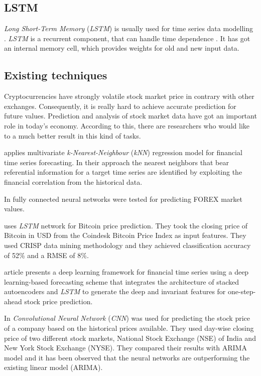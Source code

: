 \documentclass[conference]{IEEEtran}
\begin{document}
\subsection{LSTM}

\emph{Long Short-Term Memory} (\emph{LSTM}) is usually used for time series data modelling \cite{lstm}. \emph{LSTM} is a recurrent component, that can handle time dependence \cite{rnn}. It has got an internal memory cell, which provides weights for old and new input data.

\subsection{Existing techniques}

Cryptocurrencies have strongly volatile stock market price in contrary with other exchanges. Consequently, it is really hard to achieve accurate prediction for future values. Prediction and analysis of stock market data have got an important role in today’s economy. According to this, there are researchers who would like to a much better result in this kind of tasks.

\cite{b2} applies multivariate \emph{k-Nearest-Neighbour} (\emph{kNN}) regression model for financial time series forecasting. In their approach the nearest neighbors that bear referential information for a target time series are identified by exploiting the financial correlation from the historical data.

In \cite{b4} fully connected neural networks were tested for predicting FOREX market values.

\cite{b1} uses \emph{LSTM} network for Bitcoin price prediction. They took the closing price of Bitcoin in USD from the Coindesk Bitcoin Price Index as input features. They used CRISP data mining methodology and they achieved classification accuracy of 52\% and a RMSE of 8\%.

\cite{b3} article presents a deep learning framework for financial time series using a deep learning-based forecasting scheme that integrates the architecture of stacked autoencoders and \emph{LSTM} to generate the deep and invariant features for one-step-ahead stock price prediction.

In \cite{b5} \emph{Convolutional Neural Network} (\emph{CNN}) was used for predicting the stock price of a company based on the historical prices available. They used day-wise closing price of two different stock markets, National Stock Exchange (NSE) of India and New York Stock Exchange (NYSE). They compared their results with ARIMA model and it has been observed that the neural networks are outperforming the existing linear model (ARIMA).
\end{document}
